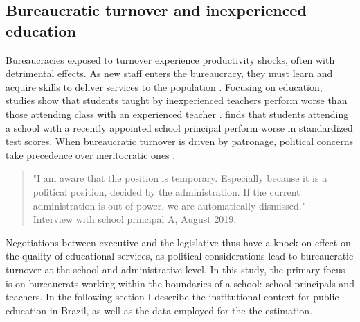 \documentclass[12pt,a4paper]{article}
\begin{document}

\subsection*{Bureaucratic turnover and inexperienced education}

Bureaucracies exposed to turnover experience productivity shocks, often with detrimental effects. As new staff enters the bureaucracy, they must learn and acquire skills to deliver services to the population \citet{gailmard_slackers_2007}. Focusing on education, studies show that students taught by inexperienced teachers perform worse than those attending class with an experienced teacher \citet{clotfelter_teacher_2007}. \citet{akhtari_political_2015} finds that students attending a school with a recently appointed school principal perform worse in standardized test scores. When bureaucratic turnover is driven by patronage, political concerns take precedence over meritocratic ones \citet{colonnelli_patronage_2017}.

\begin{quote}
"I am aware that the position is temporary. Especially because it is a political position, decided by the administration. If the current administration is out of power, we are automatically dismissed." - Interview with school principal A, August 2019.
\end{quote}

Negotiations between executive and the legislative thus have a knock-on effect on the quality of educational services, as political considerations lead to bureaucratic turnover at the school and administrative level. In this study, the primary focus is on bureaucrats working within the boundaries of a school: school principals and teachers. In the following section I describe the institutional context for public education in Brazil, as well as the data employed for the the estimation.
\end{document}
